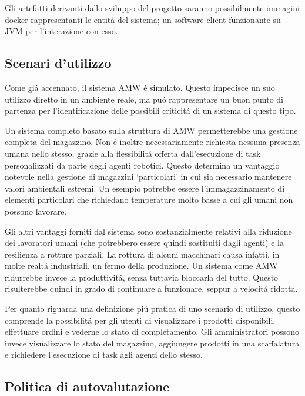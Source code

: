 Gli artefatti derivanti dallo sviluppo del progetto saranno possibilmente immagini docker rappresentanti le entità del sistema; un software client funzionante su JVM per l'interazione con esso.

\subsection{Scenari d'utilizzo}

Come gi\'a accennato, il sistema AMW \'e simulato. Questo impedisce un suo utilizzo diretto in un ambiente reale, ma pu\'o rappresentare un buon punto di partenza per l'identificazione delle possibili criticit\'a di un sistema di questo tipo.

Un sistema completo basato sulla struttura di AMW permetterebbe una gestione completa del magazzino. Non \'e inoltre necessariamente richiesta nessuna presenza umana nello stesso, grazie alla flessibilit\'a offerta dall'esecuzione di task personalizzati da parte degli agenti robotici. Questo determina un vantaggio notevole nella gestione di magazzini `particolari' in cui sia necessario mantenere valori ambientali estremi. Un esempio potrebbe essere l'immagazzinamento di elementi particolari che richiedano temperature molto basse a cui gli umani non possono lavorare.

Gli altri vantaggi forniti dal sistema sono sostanzialmente relativi alla riduzione dei lavoratori umani (che potrebbero essere quindi sostituiti dagli agenti) e la resilienza a rotture parziali. La rottura di alcuni macchinari causa infatti, in molte realt\'a industriali, un fermo della produzione. Un sistema come AMW ridurrebbe invece la produttivit\'a, senza tuttavia bloccarla del tutto. Questo risulterebbe quindi in grado di continuare a funzionare, seppur a velocit\'a ridotta.

\parag
Per quanto riguarda una definizione pi\'u pratica di uno scenario di utilizzo, questo comprende la possibilit\'a per gli utenti di visualizzare i prodotti disponibili, effettuare ordini e vederne lo stato di completamento. Gli amministratori possono invece visualizzare lo stato del magazzino, aggiungere prodotti in una scaffalatura e richiedere l'esecuzione di task agli agenti dello stesso.

\subsection{Politica di autovalutazione}

